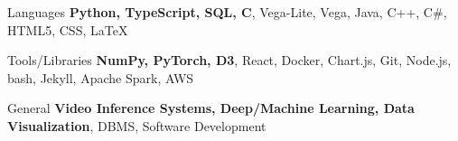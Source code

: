 

\begin{cvskills}

  \cvskill
    {Languages} %
    {{\bf Python, TypeScript, SQL, C}, Vega-Lite, Vega, Java, C++, C\#, HTML5, CSS, LaTeX} %

  \cvskill
    {Tools/Libraries} %
    {{\bf NumPy, PyTorch, D3}, React, Docker, Chart.js, Git, Node.js, bash, Jekyll, Apache Spark, AWS} %

  \cvskill
    {General} %
    {{\bf Video Inference Systems, Deep/Machine Learning, Data Visualization}, DBMS, Software Development} %


\end{cvskills}
